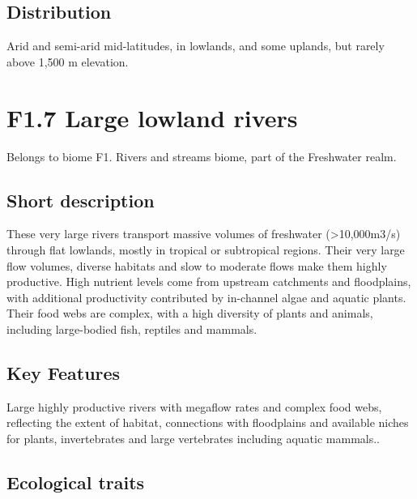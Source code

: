 \documentclass[
  letterpaper,
  DIV=11,
  numbers=noendperiod]{scrartcl}
\begin{document}
\subsection{Distribution}\label{distribution-5}

Arid and semi-arid mid-latitudes, in lowlands, and some uplands, but
rarely above 1,500 m elevation.

\section{F1.7 Large lowland rivers}\label{f1.7-large-lowland-rivers}

Belongs to biome F1. Rivers and streams biome, part of the Freshwater
realm.

\subsection{Short description}\label{short-description-6}

These very large rivers transport massive volumes of freshwater
(\textgreater10,000m3/s) through flat lowlands, mostly in tropical or
subtropical regions. Their very large flow volumes, diverse habitats and
slow to moderate flows make them highly productive. High nutrient levels
come from upstream catchments and floodplains, with additional
productivity contributed by in-channel algae and aquatic plants. Their
food webs are complex, with a high diversity of plants and animals,
including large-bodied fish, reptiles and mammals.

\subsection{Key Features}\label{key-features-6}

Large highly productive rivers with megaflow rates and complex food
webs, reflecting the extent of habitat, connections with floodplains and
available niches for plants, invertebrates and large vertebrates
including aquatic mammals..

\subsection{Ecological traits}\label{ecological-traits-6}
\end{document}
